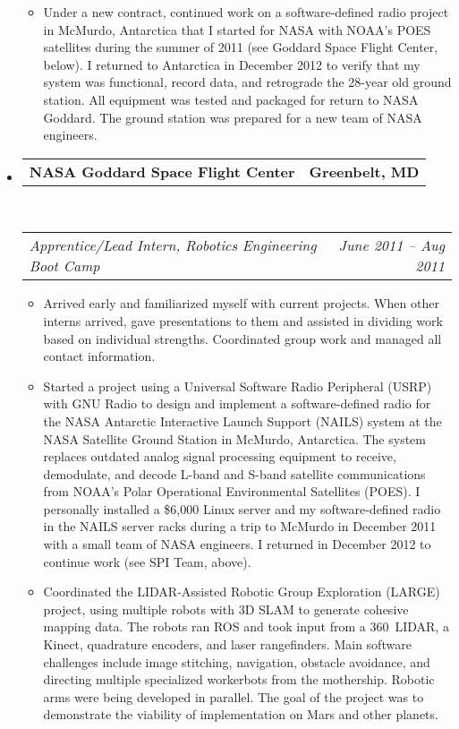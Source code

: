 \documentclass[10pt,letterpaper]{article}
\makeatletter
\newcommand{\headerrow}[2]
{\begin{tabular*}{\linewidth}{l@{\extracolsep{\fill}}r}
	#1 & #2 \\
\end{tabular*}}
\makeatother
\begin{document}
\begin{itemize}
\begin{itemize}
        \item Under a new contract, continued work on a software-defined radio
            project in McMurdo, Antarctica that I started for NASA with NOAA's
            POES satellites during the summer of 2011 (see Goddard Space Flight
            Center, below).  I returned to Antarctica in December 2012 to
            verify that my system was functional, record data, and retrograde
            the 28-year old ground station.  All equipment was tested and
            packaged for return to NASA Goddard.  The ground station was
            prepared for a new team of NASA engineers.
	\end{itemize}

	\item
	\headerrow
		{\textbf{NASA Goddard Space Flight Center}}
		{\textbf{Greenbelt, MD}}
	\\
	\headerrow
		{\emph{Apprentice/Lead Intern, Robotics Engineering Boot Camp}}
		{\emph{June 2011 -- Aug 2011}}
	\begin{itemize}
        \item Arrived early and familiarized myself with current projects.
            When other interns arrived, gave presentations to them and assisted
            in dividing work based on individual strengths.  Coordinated group
            work and managed all contact information.

        \item Started a project using a Universal Software Radio Peripheral
            (USRP) with GNU Radio to design and implement a software-defined
            radio for the NASA Antarctic Interactive Launch Support (NAILS)
            system at the NASA Satellite Ground Station in McMurdo, Antarctica.
            The system replaces outdated analog signal processing equipment to
            receive, demodulate, and decode L-band and S-band satellite
            communications from NOAA's Polar Operational Environmental
            Satellites (POES).  I personally installed a \$6,000 Linux server
            and my software-defined radio in the NAILS server racks during a
            trip to McMurdo in December 2011 with a small team of NASA
            engineers.  I returned in December 2012 to continue work (see SPI
            Team, above).

        \item Coordinated the LIDAR-Assisted Robotic Group Exploration (LARGE)
            project, using multiple robots with 3D SLAM to generate cohesive
            mapping data.  The robots ran ROS and took input from a 360\degree\
            LIDAR, a Kinect, quadrature encoders, and laser rangefinders.  Main
            software challenges include image stitching, navigation, obstacle
            avoidance, and directing multiple specialized workerbots from the
            mothership.  Robotic arms were being developed in parallel.  The
            goal of the project was to demonstrate the viability of
            implementation on Mars and other planets.
	\end{itemize}
\end{itemize}
\end{document}
